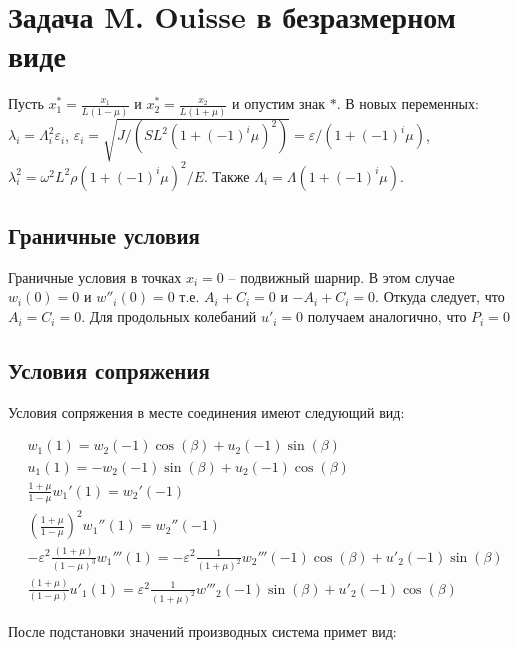 \documentclass{article}
\begin{document}
\section{Задача M. Ouisse в безразмерном виде}
Пусть $x_1^*=\frac{x_1}{L(1-\mu)}$ и $x_2^*=\frac{x_2}{L(1+\mu)}$ и опустим знак $*$. В новых переменных: $\lambda_i=\Lambda_i^2 \varepsilon_i$, $\varepsilon_i = \sqrt{J/(SL^2(1+(-1)^i \mu)^2)} = \varepsilon / (1+(-1)^i \mu) $, $\lambda_i^2=\omega^2L^2 \rho (1+(-1)^i\mu)^2/E$. Также $\Lambda_i=\Lambda(1+(-1)^i\mu)$.

\subsection{Граничные условия}

Граничные условия в точках $x_i = 0$ -- подвижный шарнир. В этом случае $w_i (0)=0$ и $w''_i (0) = 0$ т.е. $A_i + C_i = 0$ и $-A_i + C_i = 0$. Откуда следует, что $A_i = C_i =0$. Для продольных колебаний $u'_i=0$ получаем аналогично, что $P_i=0$

\subsection{Условия сопряжения}

Условия сопряжения в месте соединения имеют следующий вид:

\begin{align*}
& w_1(1)  = w_2(-1)\cos{(\beta)} + u_2(-1)\sin{(\beta)}\\
& u_1 (1) = -w_2(-1)\sin{(\beta)} + u_2 (-1) \cos{(\beta)}\\
& \frac{1+\mu}{1-\mu}w_1'(1) =w_2' (-1)\\
& (\frac{1+\mu}{1-\mu})^2w_1''(1) = w_2'' (-1)\\
& -\varepsilon^2 \frac{(1+\mu)}{(1-\mu)^3} w_1'''(1) = -\varepsilon^2 \frac{1}{(1+\mu)^2}w_2'''(-1)\cos{(\beta)} + u'_2 (-1) \sin{(\beta)}\\
& \frac{(1+\mu)}{(1-\mu)} u'_1(1) = \varepsilon^2 \frac{1}{(1+\mu)^2} w'''_2(-1)\sin{(\beta)} + u'_2(-1)\cos{(\beta)}
\end{align*}

После подстановки значений производных система примет вид:
\end{document}
